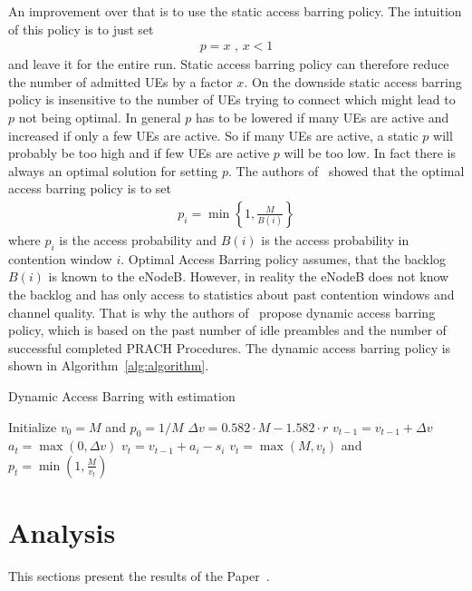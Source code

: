 \documentclass[conference]{IEEEtran}
\begin{document}
An improvement over that is to use the static access barring policy.
The intuition of this policy is to just set
\begin{align}
    p=x \text{ ,  } x<1
\end{align}
and leave it for the entire run.
Static access barring policy can therefore reduce the number of admitted UEs by a factor $x$.
On the downside static access barring policy is insensitive to the number of UEs trying to connect which might lead to $p$ not being optimal.
In general $p$ has to be lowered if many UEs are active and increased if only a few UEs are active.
So if many UEs are active, a static $p$ will probably be too high and if few UEs are active $p$ will be too low.
In fact there is always an optimal solution for setting $p$.
The authors of~\cite{1057315} showed that the optimal access barring policy is to set
\begin{align}
    p_i = \min\left\{1, \frac{M}{B(i)}\right\}
\end{align}
where $p_i$ is the access probability and $B(i)$ is the access probability in contention window $i$.
Optimal Access Barring policy assumes, that the backlog $B(i)$ is known to the eNodeB.
However, in reality the eNodeB does not know the backlog and has only access to statistics about past contention windows and channel quality.
That is why the authors of~\cite{7875393} propose dynamic access barring policy, which is based on the past number of idle preambles and the number of successful completed PRACH Procedures. The dynamic access barring policy is shown in Algorithm~\ref{alg:algorithm}.
\begin{algorithm}
    \caption{Dynamic Access Barring with estimation~\cite{7875393}}\label{alg:algorithm}
\begin{algorithmic}[1]
    \State Initialize $v_0=M$ and $p_0=1/M$
        \State $\Delta v = 0.582\cdot M - 1.582\cdot r$
        \State $v_{t-1} =v_{t-1}+\Delta v$
        \State $a_t = \max(0, \Delta v)$
        \State $v_t =v_{t-1}+a_i-s_i$
    \EndIf
    \State $v_t= \max(M, v_t)$ and $p_t =\min\left(1,\frac{M}{v_t}\right)$
\end{algorithmic}
\end{algorithm}



\section{Analysis}
This sections present the results of the Paper~\cite{8422323}.
\end{document}
